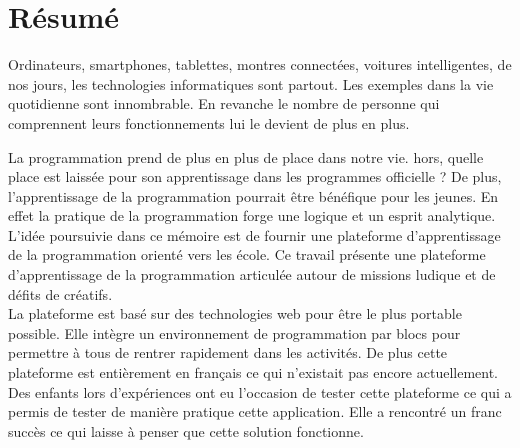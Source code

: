 \section*{Résumé}
Ordinateurs, smartphones, tablettes, montres connectées, voitures intelligentes, de nos jours, les technologies informatiques sont partout. Les exemples dans la vie quotidienne sont innombrable. En revanche le nombre de personne qui comprennent leurs fonctionnements lui le devient de plus en plus. 

La programmation prend de plus en plus de place dans notre vie. hors, quelle place est laissée pour son apprentissage dans les programmes officielle ? De plus, l'apprentissage de la programmation pourrait être bénéfique pour les jeunes. En effet la pratique de la programmation forge une logique et un esprit analytique.\\

L'idée poursuivie dans ce mémoire est de fournir une plateforme d'apprentissage de la programmation orienté vers les école. Ce travail présente une plateforme d'apprentissage de la programmation articulée autour de missions ludique et de défits de créatifs.\\

La plateforme est basé sur des technologies web pour être le plus portable possible. Elle intègre un environnement de programmation par blocs pour permettre à tous de rentrer rapidement dans les activités. De plus cette plateforme est entièrement en français ce qui n'existait pas encore actuellement.\\

Des enfants lors d'expériences ont eu l'occasion de tester cette plateforme ce qui a permis de tester de manière pratique cette application. Elle a rencontré un franc succès ce qui laisse à penser que cette solution fonctionne.



